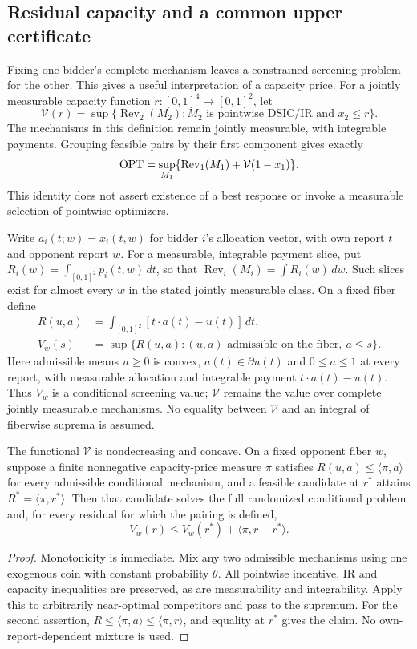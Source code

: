\subsection{Residual capacity and a common upper certificate}\label{sec:residual}
Fixing one bidder's complete mechanism leaves a constrained screening problem
for the other. This gives a useful interpretation of a capacity price.
For a jointly measurable capacity function $r:[0,1]^4\to[0,1]^2$, let
\[
\mathcal V(r)=\sup\{\operatorname{Rev}_2(M_2):
 M_2\text{ is pointwise DSIC/IR and }x_2\le r\}.
\]
The mechanisms in this definition remain jointly measurable, with integrable
payments. Grouping feasible pairs by their first component gives exactly
\[
\operatorname{OPT}=\sup_{M_1}\{\operatorname{Rev}_1(M_1)+\mathcal V(1-x_1)\}.
\]
This identity does not assert existence of a best response or invoke a
measurable selection of pointwise optimizers.

Write $a_i(t;w)=x_i(t,w)$ for bidder $i$'s allocation vector, with own
report $t$ and opponent report $w$. For a measurable, integrable payment
slice, put $R_i(w)=\int_{[0,1]^2}p_i(t,w)\,dt$, so that
$\operatorname{Rev}_i(M_i)=\int R_i(w)\,dw$. Such slices exist for almost
every $w$ in the stated jointly measurable class. On a fixed fiber define
\[
\begin{aligned}
 R(u,a)&=\int_{[0,1]^2}[t\cdot a(t)-u(t)]\,dt,\\
 V_w(s)&=\sup\{R(u,a):(u,a)\text{ admissible on the fiber},\ a\le s\}.
\end{aligned}
\]
Here admissible means $u\ge0$ is convex, $a(t)\in\partial u(t)$ and
$0\le a\le1$ at every report, with measurable allocation and integrable
payment $t\cdot a(t)-u(t)$. Thus $V_w$ is a conditional screening value;
$\mathcal V$ remains the value over complete jointly measurable mechanisms.
No equality between $\mathcal V$ and an integral of fiberwise suprema is assumed.

\begin{proposition}\label{prop:residual-value}
The functional $\mathcal V$ is nondecreasing and concave. On a fixed opponent
fiber $w$, suppose a finite nonnegative capacity-price measure $\pi$ satisfies
$R(u,a)\le\langle\pi,a\rangle$ for every admissible conditional mechanism,
and a feasible candidate at $r^*$ attains
$R^*=\langle\pi,r^*\rangle$. Then that candidate solves the full randomized
conditional problem and, for every residual for which the pairing is defined,
\[
V_w(r)\le V_w(r^*)+\langle\pi,r-r^*\rangle.
\]
\end{proposition}
\begin{proof}
Monotonicity is immediate. Mix any two admissible mechanisms using one
exogenous coin with constant probability $\theta$. All pointwise incentive,
IR and capacity inequalities are preserved, as are measurability and
integrability. Apply this to arbitrarily near-optimal competitors and pass
to the supremum. For the second assertion,
$R\le\langle\pi,a\rangle\le\langle\pi,r\rangle$, and equality at $r^*$
gives the claim. No own-report-dependent mixture is used.
\end{proof}


